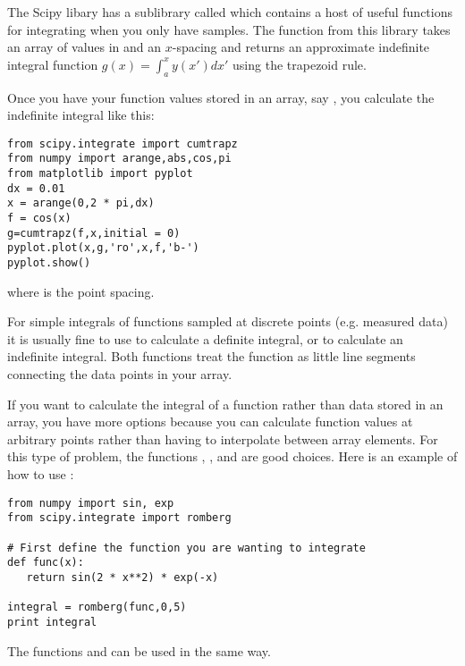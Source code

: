 The Scipy libary has a sublibrary called  which
contains a host of useful functions for integrating when you only have samples.
 The  function from this library takes an array of
values in  and an $x$-spacing  and returns an approximate
indefinite integral function $g(x)=\int_a^x y(x') dx'$ using the trapezoid
rule.

Once you have your function values stored in an array, say , you calculate
the indefinite integral like this:
\begin{Verbatim}
from scipy.integrate import cumtrapz
from numpy import arange,abs,cos,pi
from matplotlib import pyplot
dx = 0.01
x = arange(0,2 * pi,dx)
f = cos(x)
g=cumtrapz(f,x,initial = 0)
pyplot.plot(x,g,'ro',x,f,'b-')
pyplot.show()
\end{Verbatim}
where  is the point spacing.



  For simple integrals of functions sampled at discrete points
(e.g. measured data) it is usually fine to use  to calculate a
definite integral, or  to calculate an indefinite integral.
Both functions treat the function as little line segments connecting the data
points in your array.

If you want to calculate the integral of a function rather than data stored
in an array, you have more options because you can calculate function values
at arbitrary points rather than having to interpolate between array elements.
For this type of problem, the functions
,
, and  are good choices.  Here is an
example of how to use :
\begin{Verbatim}
from numpy import sin, exp
from scipy.integrate import romberg

# First define the function you are wanting to integrate
def func(x):
   return sin(2 * x**2) * exp(-x)

integral = romberg(func,0,5)
print integral
\end{Verbatim}
The functions  and  can be used in the
same way.


